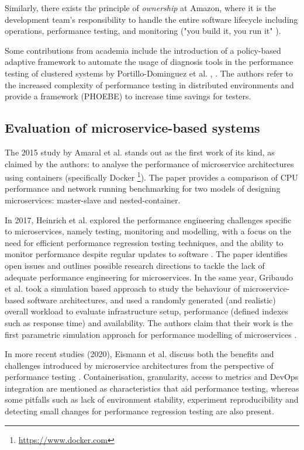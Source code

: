 Similarly, there exists the principle of \textit{ownership} at Amazon, where it is the development team's responsibility to
handle the entire software lifecycle including operations, performance testing, and monitoring ("you build it, you run it" \cite{ohanlon06}).

Some contributions from academia include the introduction of a policy-based adaptive framework to automate the usage of
diagnosis tools in the performance testing of clustered systems by Portillo-Dominguez et al. \cite{portillo14},
\cite{portillo17}. The authors refer to the increased complexity of performance testing in distributed environments and provide
a framework (PHOEBE) to increase time savings for testers.

\subsection{Evaluation of microservice-based systems}

The 2015 study by Amaral et al. \cite{amaral15} stands out as the first work of its kind, as claimed by the authors: to
analyse the performance of microservice architectures using containers (specifically Docker
\footnote{\url{https://www.docker.com}}). The paper provides a comparison of CPU performance and network running benchmarking
for two models of designing microservices: master-slave and nested-container.

In 2017, Heinrich et al. explored the performance engineering challenges specific to microservices, namely testing,
monitoring and modelling, with a focus on the need for efficient performance regression testing techniques, and the ability
to monitor performance despite regular updates to software \cite{heinrich17}. The paper identifies open issues and outlines
possible research directions to tackle the lack of adequate performance engineering for microservices.  In the same year,
Gribaudo et al. took a simulation based approach to study the behaviour of microservice-based software architectures, and
used a randomly generated (and realistic) overall workload to evaluate infrastructure setup, performance (defined indexes
such as response time) and availability. The authors claim that their work is the first parametric simulation approach for
performance modelling of microservices \cite{gribaudo17}.

In more recent studies (2020), Eismann et al. discuss both the benefits and challenges introduced by microservice
architectures from the perspective of performance testing \cite{eismann20}. Containerisation, granularity, access to metrics
and DevOps integration are mentioned as characteristics that aid performance testing, whereas some pitfalls such as lack of
environment stability, experiment reproducibility and detecting small changes for performance regression testing are also present.

